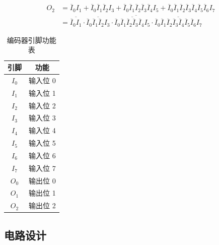 \documentclass[12pt, a4paper]{ctexart}
\begin{document}
\begin{equation}
    \begin{aligned}
        O_2&=\overline I_0I_1
            +\overline I_0\overline I_1\overline I_2I_3
            +\overline I_0\overline I_1\overline I_2\overline I_3\overline I_4I_5
            +\overline I_0\overline I_1\overline I_2\overline I_3\overline I_4\overline I_5\overline I_6I_7
        \\ &=\overline{
            \overline{\overline I_0I_1}\cdot
            \overline{\overline I_0\overline I_1\overline I_2I_3}\cdot
            \overline{\overline I_0\overline I_1\overline I_2\overline I_3\overline I_4I_5}\cdot
            \overline{\overline I_0\overline I_1\overline I_2\overline I_3\overline I_4\overline I_5\overline I_6I_7}
        }
    \end{aligned}
\end{equation}

\begin{table}[H]
    \centering
    \begin{tabular}{|c|c|}
        \hline
        引脚 & 功能 \\
        \hline
        $I_0$ & 输入位 0 \\
        $I_1$ & 输入位 1 \\
        $I_2$ & 输入位 2 \\
        $I_3$ & 输入位 3 \\
        $I_4$ & 输入位 4 \\
        $I_5$ & 输入位 5 \\
        $I_6$ & 输入位 6 \\
        $I_7$ & 输入位 7 \\
        \hline
        $O_0$ & 输出位 0 \\
        $O_1$ & 输出位 1 \\
        $O_2$ & 输出位 2 \\
        \hline
    \end{tabular}
    \caption{编码器引脚功能表}
\end{table}

\subsection{电路设计}
\end{document}
